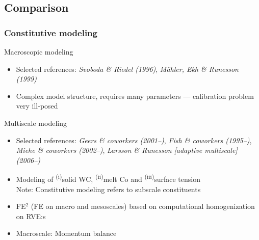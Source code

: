 \documentclass[11pt,mathserif]{beamer}
\newcommand{\roughcite}[1]{\textit{#1}}
\begin{document}
\subsection{Comparison}
\begin{frame}
 \frametitle{Constitutive modeling}
 Macroscopic modeling
 \begin{itemize}
  \item Selected references: \roughcite{Svoboda \& Riedel (1996)}, \roughcite{Mähler, Ekh \& Runesson (1999)}
  \item Complex model structure, requires many parameters --- calibration problem very ill-posed
 \end{itemize}

 Multiscale modeling
 \begin{itemize}
  \item Selected references:  \roughcite{Geers \& coworkers (2001--)},
 \roughcite{Fish \& coworkers (1995--)},
 \roughcite{Miehe \& coworkers (2002--)},
 \roughcite{Larsson \& Runesson [adaptive multiscale] (2006--)}
  \item Modeling of \textsuperscript{(i)}solid WC, \textsuperscript{(ii)}melt Co and \textsuperscript{(iii)}surface tension\\
  Note: Constitutive modeling refers to subscale constituents
  \item FE$^2$ (FE on macro and mesoscales) based on computational homogenization on RVE:s
  \item Macroscale: Momentum balance
 \end{itemize}
\end{frame}
\end{document}
